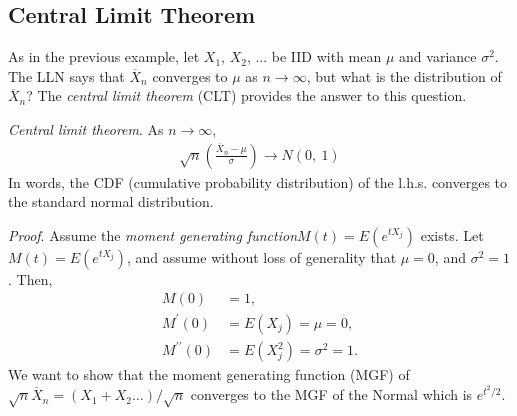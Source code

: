 \documentclass[11pt,a4paper]{article}
\begin{document}
\subsection{Central Limit Theorem}

As in the previous example, 
let \(X_{1}\), \(X_{2}\), ... be IID with mean \(\mu\) 
and variance \(\sigma^{2}\). 
The LLN says that \({\overline{X}}_{n}\) converges to \(\mu\) as \(n \rightarrow \infty\),
but what is the distribution of \({\overline{X}}_{n}\)? 
The \emph{central limit theorem} (CLT) provides the answer to this question.

\emph{Central limit theorem}. As \(n \rightarrow \infty\),
\begin{align}
\sqrt{n}\left( \frac{{\overline{X}}_{n} - \mu}{\sigma} \right) \rightarrow N(0,\ 1)
\end{align}
In words, 
the CDF (cumulative probability distribution) of the l.h.s.
converges to the standard normal distribution.

\emph{Proof}. Assume the \emph{moment generating function}\(M(t) = E(e^{tX_{j}})\) exists.
Let \(M(t) = E(e^{tX_{j}})\), 
and assume without loss of generality that \(\mu = 0\), 
and \(\sigma^{2} = 1\). 
Then, 
\begin{equation}
\begin{split}
M(0) &= 1,\\
M^{\prime}(0) &= E(X_{j}) = \mu = 0,\\
M^{\prime\prime}(0) &= E\left( X_{j}^{2} \right) = \sigma^{2} = 1.
\end{split}
\end{equation}
We want to show that the moment generating function (MGF) of
\(\sqrt{n}\overline{X}_{n} = (X_{1} + X_{2}\ldots)/\sqrt{n}\)
converges to the MGF of the Normal which is \(e^{t^{2}/2}\).
\end{document}
